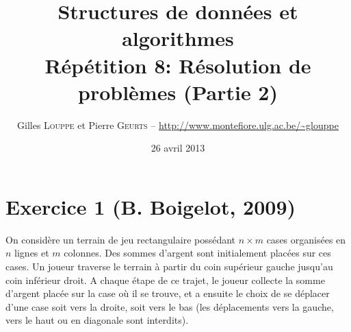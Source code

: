 \documentclass[a4paper,10pt]{article}
\title{
    \textbf{Structures de données et algorithmes}\\
    Répétition 8: Résolution de problèmes (Partie 2)
}
\author{Gilles \textsc{Louppe} et Pierre \textsc{Geurts} -- \url{http://www.montefiore.ulg.ac.be/~glouppe}}
\date{26 avril 2013}
\begin{document}
\maketitle








\section*{Exercice 1 {\small (B. Boigelot, 2009)}}

On considère un terrain de jeu rectangulaire possédant $n\times m$ cases organisées en
$n$ lignes et $m$ colonnes. Des sommes d'argent sont initialement placées sur
ces cases. Un joueur traverse le terrain à partir du coin supérieur gauche
jusqu'au coin inférieur droit. A chaque étape de ce trajet, le joueur collecte
la somme d'argent placée sur la case où il se trouve, et a ensuite le choix de
se déplacer d'une case soit vers la droite, soit vers le bas (les déplacements
vers la gauche, vers le haut ou en diagonale sont interdits).
\end{document}
